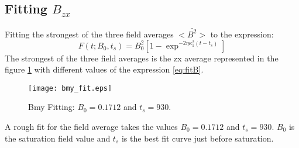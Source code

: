 \subsection{Fitting $B_{zx}$}
Fitting the strongest of the three field averages $<\bar{B^2}>$ to the expression:
\begin{equation}
 F(t;B_0,t_s)=B_0^2[1-\exp^{-2\eta\kappa_1^2(t-t_s)}]
\label{eq:fitB}
\end{equation}
The strongest of the three field averages is the zx average represented in the figure \ref{fig:bmy_fit} with different values of the expression \ref{eq:fitB}.
\begin{figure}[h]
\centering
\texttt{[image: bmy\_fit.eps]}
\caption{Bmy Fitting: $B_0=0.1712$ and $t_s = 930$.}
\label{fig:bmy_fit}
 \end{figure}
A rough fit for the field average takes the values $B_0=0.1712$ and $t_s = 930$.
$B_0$ is the saturation field value and $t_s$ is the best fit curve just before saturation.


